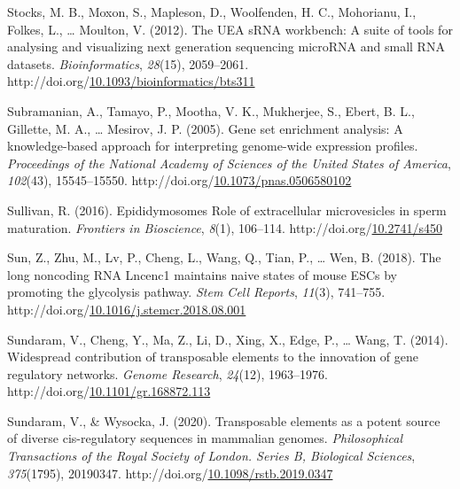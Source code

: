 \documentclass[12pt,twoside]{reedthesis}
\newlength{\cslhangindent}
\newenvironment{CSLReferences}[2] %
 {%
  \setlength{\parindent}{0pt}
  \ifodd #1 \everypar{\setlength{\hangindent}{\cslhangindent}}\ignorespaces\fi
  \ifnum #2 > 0
  \setlength{\parskip}{#2\baselineskip}
  \fi
 }%
 {}
\begin{document}
\begin{CSLReferences}{1}{0}
\leavevmode{}%
Stocks, M. B., Moxon, S., Mapleson, D., Woolfenden, H. C., Mohorianu, I., Folkes, L., \ldots{} Moulton, V. (2012). The UEA sRNA workbench: A suite of tools for analysing and visualizing next generation sequencing microRNA and small RNA datasets. \emph{Bioinformatics}, \emph{28}(15), 2059--2061. http://doi.org/\href{https://doi.org/10.1093/bioinformatics/bts311}{10.1093/bioinformatics/bts311}

\leavevmode{}%
Subramanian, A., Tamayo, P., Mootha, V. K., Mukherjee, S., Ebert, B. L., Gillette, M. A., \ldots{} Mesirov, J. P. (2005). Gene set enrichment analysis: A knowledge-based approach for interpreting genome-wide expression profiles. \emph{Proceedings of the National Academy of Sciences of the United States of America}, \emph{102}(43), 15545--15550. http://doi.org/\href{https://doi.org/10.1073/pnas.0506580102}{10.1073/pnas.0506580102}

\leavevmode{}%
Sullivan, R. (2016). Epididymosomes Role of extracellular microvesicles in sperm maturation. \emph{Frontiers in Bioscience}, \emph{8}(1), 106--114. http://doi.org/\href{https://doi.org/10.2741/s450}{10.2741/s450}

\leavevmode{}%
Sun, Z., Zhu, M., Lv, P., Cheng, L., Wang, Q., Tian, P., \ldots{} Wen, B. (2018). The long noncoding RNA Lncenc1 maintains naive states of mouse ESCs by promoting the glycolysis pathway. \emph{Stem Cell Reports}, \emph{11}(3), 741--755. http://doi.org/\href{https://doi.org/10.1016/j.stemcr.2018.08.001}{10.1016/j.stemcr.2018.08.001}

\leavevmode{}%
Sundaram, V., Cheng, Y., Ma, Z., Li, D., Xing, X., Edge, P., \ldots{} Wang, T. (2014). Widespread contribution of transposable elements to the innovation of gene regulatory networks. \emph{Genome Research}, \emph{24}(12), 1963--1976. http://doi.org/\href{https://doi.org/10.1101/gr.168872.113}{10.1101/gr.168872.113}

\leavevmode{}%
Sundaram, V., \& Wysocka, J. (2020). Transposable elements as a potent source of diverse cis-regulatory sequences in mammalian genomes. \emph{Philosophical Transactions of the Royal Society of London. Series B, Biological Sciences}, \emph{375}(1795), 20190347. http://doi.org/\href{https://doi.org/10.1098/rstb.2019.0347}{10.1098/rstb.2019.0347}


\end{CSLReferences}
\end{document}
